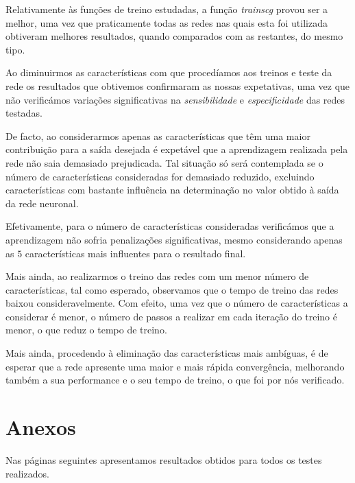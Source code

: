 \documentclass{article}
\begin{document}
Relativamente às funções de treino estudadas, a função \emph{trainscg} provou ser a melhor, uma vez que praticamente todas as redes nas quais esta foi utilizada obtiveram melhores resultados, quando comparados com as restantes, do mesmo tipo.

Ao diminuirmos as características com que procedíamos aos treinos e teste da rede os resultados que obtivemos confirmaram as nossas expetativas, uma vez que não verificámos variações significativas na \emph{sensibilidade} e \emph{especificidade} das redes testadas.

De facto, ao considerarmos apenas as características que têm uma maior contribuição para a saída desejada é expetável que a aprendizagem realizada pela rede não saia demasiado prejudicada. Tal situação só será contemplada se o número de características consideradas for demasiado reduzido, excluindo características com bastante influência na determinação no valor obtido à saída da rede neuronal.

Efetivamente, para o número de características consideradas verificámos que a aprendizagem não sofria penalizações significativas, mesmo considerando apenas as $5$ características mais influentes para o resultado final.

Mais ainda, ao realizarmos o treino das redes com um menor número de características, tal como esperado, observamos que o tempo de treino das redes baixou consideravelmente. Com efeito, uma vez que o número de características a considerar é menor, o número de passos a realizar em cada iteração do treino é menor, o que reduz o tempo de treino.

Mais ainda, procedendo à eliminação das características mais ambíguas, é de esperar que a rede apresente uma maior e mais rápida convergência, melhorando também a sua performance e o seu tempo de treino, o que foi por nós verificado.

\pagebreak

\section{Anexos}

Nas páginas seguintes apresentamos resultados obtidos para todos os testes realizados.


\end{document}
